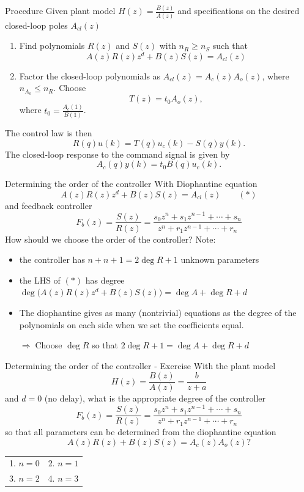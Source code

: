\documentclass[presentation,aspectratio=169]{beamer}
\begin{document}
\begin{frame}[label={sec:org0c8aa0e}]{Procedure}
Given plant model \(H(z)=\frac{B(z)}{A(z)}\) and specifications on the desired closed-loop poles \(A_{cl}(z)\)
\begin{enumerate}
\item Find polynomials \(R(z)\) and \(S(z)\) with \(n_R \ge n_S\) such that 
\[ A(z)R(z)z^{d} + B(z)S(z) = A_{cl}(z) \]
\item Factor the closed-loop polynomials as \(A_{cl}(z) = A_c(z)A_o(z)\), where \(n_{A_o} \le n_R\). Choose
\[T(z) = t_0 A_o(z),\] where \(t_0 = \frac{A_c(1)}{B(1)}\).
\end{enumerate}

The control law is then
\[ R(q) u(k) = T(q)u_c(k) - S(q)y(k). \]
The closed-loop response to the command signal is given by
\[ A_c(q)y(k) = t_0 B(q) u_c(k). \]
\end{frame}
\begin{frame}[label={sec:org4fc5796}]{Determining the order of the controller}
With Diophantine equation 
   \[ A(z)R(z)z^{d} + B(z)S(z) = A_{cl}(z) \qquad (*) \]
and feedback controller
\[F_b(z) = \frac{S(z)}{R(z)} = \frac{s_0z^n + s_1z^{n-1} + \cdots + s_n}{z^n + r_1 z^{n-1} + \cdots + r_n}\]
\alert{How should we choose the order of the controller?} Note:
\begin{itemize}
\item the controller has \(n+n+1 = 2\deg R + 1\) unknown parameters
\item the LHS of \((*)\) has degree \(\deg \big(A(z)R(z)z^d + B(z)S(z)\big) = \deg A + \deg R + d\)
\item The diophantine gives as many (nontrivial) equations as the degree of the polynomials on each side when we set the coefficients equal.

\alert{\(\Rightarrow\;\)Choose \(\deg R\) so that \(2\deg R + 1 = \deg A + \deg R + d\)}
\end{itemize}
\end{frame}


\begin{frame}[label={sec:org012c28b}]{Determining the order of the controller - Exercise}
With the plant model \[H(z) = \frac{B(z)}{A(z)} = \frac{b}{z + a}\] and \(d=0\) (no delay), what is the appropriate degree of the controller 
\[F_b(z) = \frac{S(z)}{R(z)} = \frac{s_0z^n + s_1z^{n-1} + \cdots + s_n}{z^n + r_1 z^{n-1} + \cdots + r_n}\]
so that all parameters can be determined from the diophantine equation
\[ A(z)R(z) + B(z)S(z) = A_c(z)A_o(z)?\]
\begin{center}
\begin{tabular}{ll}
1. \(n = 0\) & 2. \(n = 1\)\\
3. \(n=2\) & 4. \(n=3\)\\
\end{tabular}
\end{center}
\end{frame}
\end{document}

